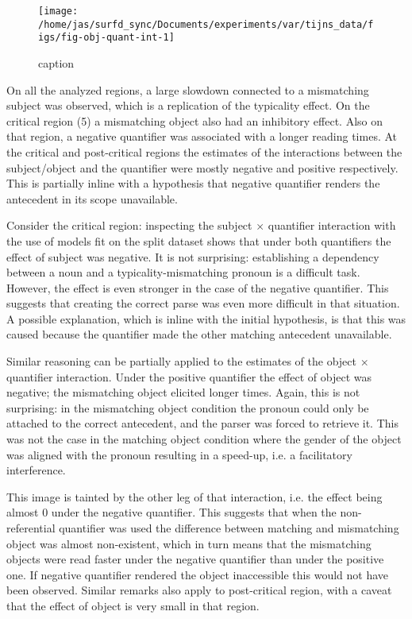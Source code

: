 \begin{knitrout}
\color{fgcolor}\begin{figure}
\texttt{[image: /home/jas/surfd\_sync/Documents/experiments/var/tijns\_data/figs/fig-obj-quant-int-1]} \caption[caption]{caption}\label{fig:fig-obj-quant-int}
\end{figure}

\end{knitrout}

On all the analyzed regions, a large slowdown connected to a mismatching subject was observed, which is a replication of the typicality effect. On the critical region (5) a mismatching object also had an inhibitory effect.
Also on that region, a negative quantifier was associated with a longer reading times. At the critical and post-critical regions the estimates of the interactions between the subject/object and the quantifier were mostly negative and positive respectively. This is partially inline with a hypothesis that negative quantifier renders the antecedent in its scope unavailable.

Consider the critical region: inspecting the subject $\times$ quantifier interaction with the use of models fit on the split dataset shows that under both quantifiers the effect of subject was negative. It is not surprising: establishing a dependency between a noun and a typicality-mismatching pronoun is a difficult task. However, the effect is even stronger in the case of the negative quantifier. This suggests that creating the correct parse was even more difficult in that situation. A possible explanation, which is inline with the initial hypothesis, is that this was caused because the quantifier made the other matching antecedent unavailable.

Similar reasoning can be partially applied to the estimates of the object $\times$ quantifier interaction.
Under the positive quantifier the effect of object was negative; the mismatching object elicited longer times. Again, this is not surprising: in the mismatching object condition the pronoun could only be attached to the correct antecedent, and the parser was forced to retrieve it. This was not the case in the matching object condition where the gender of the object was aligned with the pronoun resulting in a speed-up, i.e. a facilitatory interference.

This image is tainted by the other leg of that interaction, i.e. the effect being almost 0 under the negative quantifier. This suggests that when the non-referential quantifier was used the difference between matching and mismatching object was almost non-existent, which in turn means that the mismatching objects were read faster under the negative quantifier than under the positive one. If negative quantifier rendered the object inaccessible this would not have been observed.
Similar remarks also apply to post-critical region, with a caveat that the effect of object is very small in that region.

